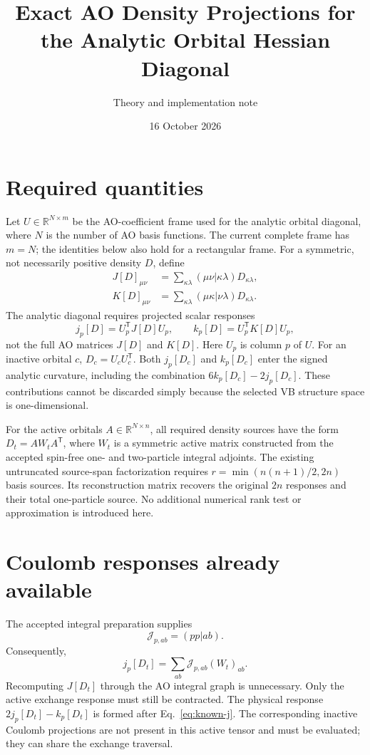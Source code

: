 \documentclass[11pt,a4paper]{article}
\title{Exact AO Density Projections for the Analytic Orbital Hessian Diagonal}
\author{Theory and implementation note}
\date{16 October 2026}
\newcommand{\T}{^{\mathsf T}}
\begin{document}
\maketitle

\section{Required quantities}

Let $U\in\mathbb R^{N\times m}$ be the AO-coefficient frame used for the
analytic orbital diagonal, where $N$ is the number of AO basis functions.
The current complete frame has $m=N$; the identities below also hold for
a rectangular frame. For a symmetric, not necessarily positive density
$D$, define
\begin{align}
 J[D]_{\mu\nu}&=\sum_{\kappa\lambda}
       (\mu\nu|\kappa\lambda)D_{\kappa\lambda},\\
 K[D]_{\mu\nu}&=\sum_{\kappa\lambda}
       (\mu\kappa|\nu\lambda)D_{\kappa\lambda}.
\end{align}
The analytic diagonal requires projected scalar responses
\begin{equation}\label{eq:diag}
 j_p[D]=U_p\T J[D]U_p,\qquad
 k_p[D]=U_p\T K[D]U_p,
\end{equation}
not the full AO matrices $J[D]$ and $K[D]$. Here $U_p$ is column $p$ of
$U$. For an inactive orbital $c$, $D_c=U_cU_c\T$. Both $j_p[D_c]$ and
$k_p[D_c]$ enter the signed analytic curvature, including the combination
$6k_p[D_c]-2j_p[D_c]$. These contributions cannot be discarded simply
because the selected VB structure space is one-dimensional.

For the active orbitals $A\in\mathbb R^{N\times n}$, all required density
sources have the form $D_t=A W_t A\T$, where $W_t$ is a symmetric active
matrix constructed from the accepted spin-free one- and two-particle
integral adjoints. The existing untruncated source-span factorization
requires $r=\min(n(n+1)/2,2n)$ basis sources. Its reconstruction matrix
recovers the original $2n$ responses and their total one-particle source.
No additional numerical rank test or approximation is introduced here.

\section{Coulomb responses already available}

The accepted integral preparation supplies
\begin{equation}
 \mathcal J_{p,ab}=(pp|ab).
\end{equation}
Consequently,
\begin{equation}\label{eq:known-j}
 j_p[D_t]=\sum_{ab}\mathcal J_{p,ab}(W_t)_{ab}.
\end{equation}
Recomputing $J[D_t]$ through the AO integral graph is unnecessary.
Only the active exchange response must still be contracted. The physical
response $2j_p[D_t]-k_p[D_t]$ is formed after Eq.~\eqref{eq:known-j}.
The corresponding inactive Coulomb projections are not present in this
active tensor and must be evaluated; they can share the exchange traversal.
\end{document}

